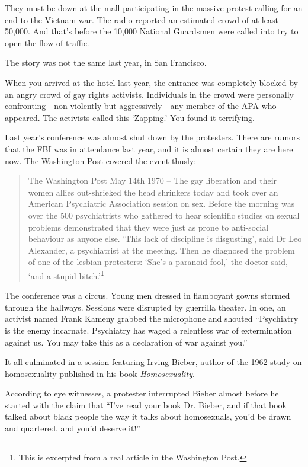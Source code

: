 \begin{refsection}
They must be down at the mall participating in the massive protest calling for an end to the Vietnam war. The radio reported an estimated crowd of at least 50,000. And that's before the 10,000 National Guardsmen were called into try to open the flow of traffic.

The story was not the same last year, in San Francisco. 

When you arrived at the hotel last year, the entrance was completely blocked by an angry crowd of gay rights activists. Individuals in the crowd were personally confronting---non-violently but aggressively---any member of the APA who appeared. The activists called this `Zapping.' You found it terrifying.

Last year's conference was almost shut down by the protesters. There are rumors that the FBI was in attendance last year, and it is almost certain they are here now. The Washington Post covered the event thusly:

\begin{quote}

The Washington Post May 14th 1970 -- The gay liberation and their women allies out-shrieked the head shrinkers today and took over an American Psychiatric Association session on sex. Before the morning was over the 500 psychiatrists who gathered to hear scientific studies on sexual problems demonstrated that they were just as prone to anti-social behaviour as anyone else. `This lack of discipline is disgusting', said Dr Leo Alexander, a psychiatrist at the meeting. Then he diagnosed the problem of one of the lesbian protesters: `She's a paranoid fool,' the doctor said, `and a stupid bitch.'\footnote{This is excerpted from a real article in the Washington Post.}
\end{quote}

The conference was a circus. Young men dressed in flamboyant gowns stormed through the hallways. Sessions were disrupted by guerrilla theater. In one, an activist named Frank Kameny grabbed the microphone and shouted ``Psychiatry is the enemy incarnate. Psychiatry has waged a relentless war of extermination against us. You may take this as a declaration of war against you.''

It all culminated in a session featuring Irving Bieber, author of the 1962 study on homosexuality published in his book \emph{Homosexuality}.

According to eye witnesses, a protester interrupted Bieber almost before he started with the claim that ``I've read your book Dr. Bieber, and if that book talked about black people the way it talks about homosexuals, you'd be drawn and quartered, and you'd deserve it!'' ~\citep[p. 200--201]{Clendinen:2013wy} 


\end{refsection}
